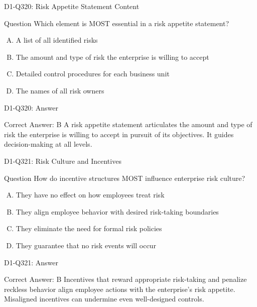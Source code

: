 \documentclass{beamer}
\begin{document}
\begin{frame}{D1-Q320: Risk Appetite Statement Content}
	\begin{block}{Question}
		Which element is MOST essential in a risk appetite statement?
	\end{block}
	\begin{enumerate}[(A)]
		\item A list of all identified risks
		\item The amount and type of risk the enterprise is willing to accept
		\item Detailed control procedures for each business unit
		\item The names of all risk owners
	\end{enumerate}
\end{frame}
\begin{frame}{D1-Q320: Answer}
	\begin{block}{Correct Answer: B}
		A risk appetite statement articulates the amount and type of risk the enterprise is willing to accept in pursuit of its objectives. It guides decision-making at all levels.
	\end{block}
\end{frame}

\begin{frame}{D1-Q321: Risk Culture and Incentives}
	\begin{block}{Question}
		How do incentive structures MOST influence enterprise risk culture?
	\end{block}
	\begin{enumerate}[(A)]
		\item They have no effect on how employees treat risk
		\item They align employee behavior with desired risk-taking boundaries
		\item They eliminate the need for formal risk policies
		\item They guarantee that no risk events will occur
	\end{enumerate}
\end{frame}
\begin{frame}{D1-Q321: Answer}
	\begin{block}{Correct Answer: B}
		Incentives that reward appropriate risk-taking and penalize reckless behavior align employee actions with the enterprise's risk appetite. Misaligned incentives can undermine even well-designed controls.
	\end{block}
\end{frame}
\end{document}
